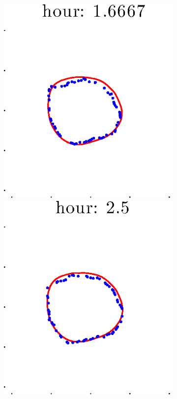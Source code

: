 \documentclass[12pt]{article}
\begin{document}
\begin{figure}[h!]
\begin{subfigure}[b]{.3\textwidth}
		\includegraphics[height=.15\textheight]{Pos5exp2/firsthalf/second3.eps}
		\includegraphics[height=.15\textheight]{Pos5exp2/firsthalf/second4.eps}

\end{subfigure}
\end{figure}
\end{document}
